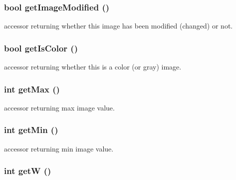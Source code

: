 \subsubsection{\setlength{\rightskip}{0pt plus 5cm}bool get\-Image\-Modified ()}\label{class_c_s_image_viewer_1_1_image_data_68c87c6f22371f3afa7e5e55edf80148}


accessor returning whether this image has been modified (changed) or not. 

\subsubsection{\setlength{\rightskip}{0pt plus 5cm}bool get\-Is\-Color ()}\label{class_c_s_image_viewer_1_1_image_data_f1e4c902ded334322ec78572ebfedc90}


accessor returning whether this is a color (or gray) image. 

\subsubsection{\setlength{\rightskip}{0pt plus 5cm}int get\-Max ()}\label{class_c_s_image_viewer_1_1_image_data_12b2f50470d2cc288a8fe7ba0a5556b2}


accessor returning max image value. 

\subsubsection{\setlength{\rightskip}{0pt plus 5cm}int get\-Min ()}\label{class_c_s_image_viewer_1_1_image_data_51f5173282f478ea52841f6d8a77312b}


accessor returning min image value. 

\subsubsection{\setlength{\rightskip}{0pt plus 5cm}int get\-W ()}\label{class_c_s_image_viewer_1_1_image_data_3aefd997355d42089a4dae14cd22b0b7}


